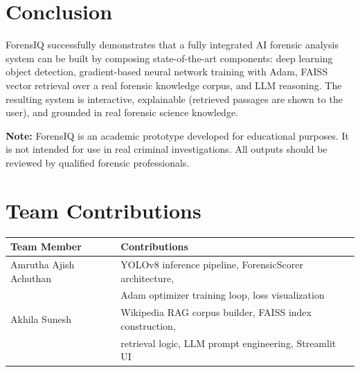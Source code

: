 \documentclass[12pt,a4paper]{article}
\begin{document}
\section{Conclusion}

ForensIQ successfully demonstrates that a fully integrated AI forensic analysis
system can be built by composing state-of-the-art components: deep learning
object detection, gradient-based neural network training with Adam, FAISS vector
retrieval over a real forensic knowledge corpus, and LLM reasoning. The
resulting system is interactive, explainable (retrieved passages are shown to
the user), and grounded in real forensic science knowledge.

\vspace{0.5cm}
\begin{mdframed}[backgroundcolor=lightgray, linecolor=primary, linewidth=1pt]
  \textbf{Note:} ForensIQ is an academic prototype developed for educational
  purposes. It is not intended for use in real criminal investigations. All
  outputs should be reviewed by qualified forensic professionals.
\end{mdframed}

\section*{Team Contributions}

\begin{table}[h!]
  \centering
  \begin{tabular}{ll}
    \toprule
    \textbf{Team Member} & \textbf{Contributions} \\
    \midrule
    Amrutha Ajish Achuthan
      & YOLOv8 inference pipeline, ForensicScorer architecture, \\
      & Adam optimizer training loop, loss visualization \\
    \addlinespace
    Akhila Sunesh
      & Wikipedia RAG corpus builder, FAISS index construction, \\
      & retrieval logic, LLM prompt engineering, Streamlit UI \\
    \bottomrule
  \end{tabular}
\end{table}
\end{document}
